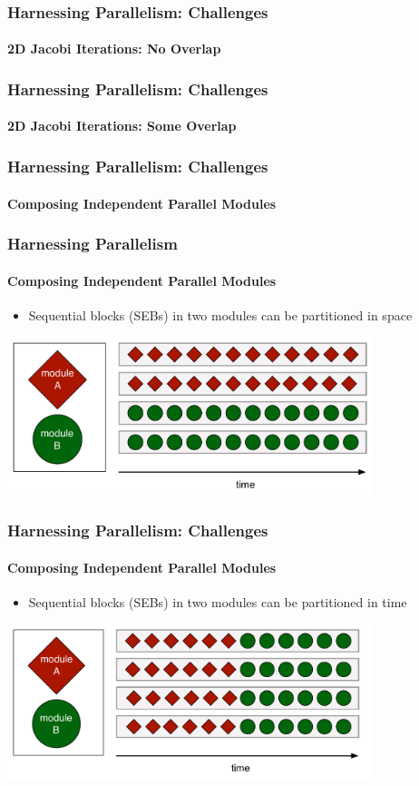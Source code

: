 \begin{frame}[fragile]
\frametitle{Harnessing Parallelism: Challenges}
\framesubtitle{2D Jacobi Iterations: No Overlap}
    
\end{frame}


\begin{frame}
\frametitle{Harnessing Parallelism: Challenges}
\framesubtitle{2D Jacobi Iterations: Some Overlap}
    
\end{frame}


\begin{frame}[fragile]
\frametitle{Harnessing Parallelism: Challenges}
\framesubtitle{Composing Independent Parallel Modules}
  \frametitle{Harnessing Parallelism}
  \framesubtitle{Composing Independent Parallel Modules}
  \begin{itemize}
    \item Sequential blocks (SEBs) in two modules can be partitioned in space
  \end{itemize}
  \begin{center}
    \includegraphics[width=0.8\textwidth]{figures/spaceDivision.pdf}
  \end{center}
\end{frame}

\begin{frame}[fragile]
\frametitle{Harnessing Parallelism: Challenges}
\framesubtitle{Composing Independent Parallel Modules}
  \begin{itemize}
    \item Sequential blocks (SEBs) in two modules can be partitioned in time
  \end{itemize}
  \begin{center}
    \includegraphics[width=0.8\textwidth]{figures/timeDivision.pdf}
  \end{center}
\end{frame}
